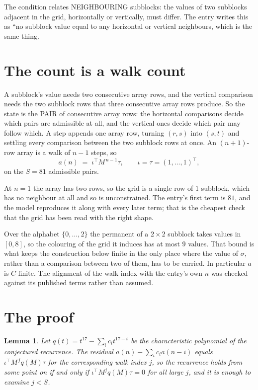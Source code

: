 \documentclass[11pt,a4paper]{article}
\theoremstyle{plain}
\newtheorem{lemma}[theorem]{Lemma}
\theoremstyle{definition}
\begin{document}
The condition relates NEIGHBOURING subblocks: the values of two subblocks adjacent in the grid,
horizontally or vertically, must differ. The entry writes this as ``no subblock value equal to any horizontal or vertical neighbours, which is the same thing.

\section{The count is a walk count}

A subblock's value needs two consecutive array rows, and the vertical
comparison needs the two subblock rows that three consecutive array rows produce. So the state
is the PAIR of consecutive array rows: the horizontal comparisons decide which pairs are
admissible at all, and the vertical ones decide which pair may follow which. A step appends one
array row, turning $(r,s)$ into $(s,t)$ and settling every comparison between the two subblock
rows at once. An $(n+1)$-row array is a walk of $n-1$ steps, so
\[
a(n)\;=\;\iota^{\!\top}M^{\,n-1}\tau,\qquad\iota=\tau=(1,\dots,1)^{\!\top},
\]
on the $S=81$ admissible pairs.

At $n=1$ the array has two rows, so the grid is a single row of $1$
subblock, which has no neighbour at all and so is unconstrained. The
entry's first term is $81$, and the model reproduces it along with every later term; that
is the cheapest check that the grid has been read with the right shape.

Over the alphabet $\{0,\dots,2\}$ the permanent of a $2\times2$ subblock takes values in
$[0,8]$, so the colouring of the grid it induces has at most $9$ values.
That bound is what keeps the construction below finite in the only place where the value of
$\sigma$, rather than a comparison between two of them, has to be carried.
In particular $a$ is $C$-finite. The alignment of the walk index with the entry's own $n$ was
checked against its published terms rather than assumed.

\section{The proof}

\begin{lemma}\label{lem:crit}
Let $q(t)=t^{17}-\sum_i c_it^{17-i}$ be the characteristic polynomial of the
conjectured recurrence. The residual $a(n)-\sum_ic_ia(n-i)$ equals
$\iota^{\!\top}M^{\,j}q(M)\tau$ for the corresponding walk index $j$, so the recurrence
holds from some point on if and only if $\iota^{\!\top}M^{j}q(M)\tau=0$ for all large $j$,
and it is enough to examine $j<S$.
\end{lemma}
\end{document}
